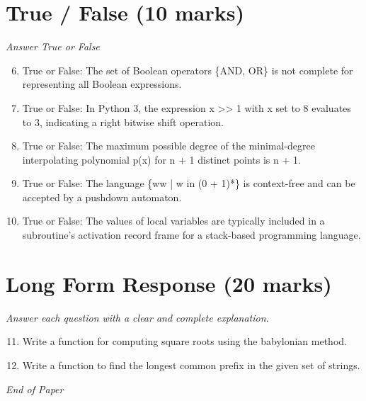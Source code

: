 \documentclass[12pt]{article}
\begin{document}
\section*{True / False (10 marks)}
\textit{Answer True or False}
\begin{enumerate}[label=\arabic*.]
\setcounter{enumi}{5}
\item True or False: The set of Boolean operators \{AND, OR\} is not complete for representing all Boolean expressions.
\item True or False: In Python 3, the expression x \textgreater{}\textgreater{} 1 with x set to 8 evaluates to 3, indicating a right bitwise shift operation.
\item True or False: The maximum possible degree of the minimal-degree interpolating polynomial p(x) for n + 1 distinct points is n + 1.
\item True or False: The language \{ww | w in (0 + 1)*\} is context-free and can be accepted by a pushdown automaton.
\item True or False: The values of local variables are typically included in a subroutine's activation record frame for a stack-based programming language.
\end{enumerate}

\section*{Long Form Response (20 marks)}
\textit{Answer each question with a clear and complete explanation.}
\begin{enumerate}[label=\arabic*.]
\setcounter{enumi}{10}
\item Write a function for computing square roots using the babylonian method.
\item Write a function to find the longest common prefix in the given set of strings.
\end{enumerate}

\vfill
\noindent\textit{End of Paper}
\end{document}
